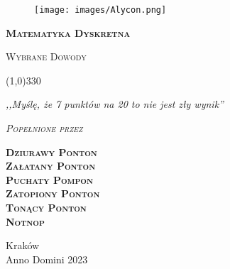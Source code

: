 \begin{titlepage}

	\begin{center}
		\begin{figure}[h]
			\centering
			\texttt{[image: images/Alycon.png]}
		\end{figure}
		\vspace{0.5cm}
		\Huge
		\textbf{\textsc{Matematyka Dyskretna}}

		\vspace{0.5cm}
		\Large
		\textsc{Wybrane Dowody}

		\normalsize


		\line(1,0){330}

		\vspace{1cm}
		\textit{,,Myślę, że 7 punktów na 20 to nie jest zły wynik''}
		\vspace{1cm}

		\textit{\textsc{Popełnione przez}}\\
		\vspace{5mm}

		\textbf{\textsc{Dziurawy Ponton \\ Załatany Ponton \\ Puchaty Pompon \\ Zatopiony Ponton \\ Tonący Ponton \\ Notnop}}

		\vfill

		Kraków \\
		Anno Domini 2023

	\end{center}

\end{titlepage}
